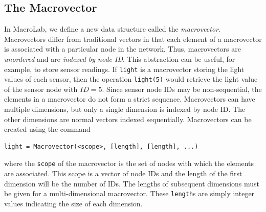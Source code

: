 \subsection{The Macrovector}

In MacroLab, we define a new data structure called the {\em macrovector}.
Macrovectors differ from traditional vectors in that each element of a
macrovector is associated with a particular node in the network.
Thus, macrovectors are \emph{unordered} and are \emph{indexed by node ID}.
This abstraction can be useful, for example, to store sensor readings. If
{\tt light} is a macrovector storing the light values of each sensor,
then the operation {\tt light(5)} would retrieve the light value of the sensor
node with $ID=5$. Since sensor node IDs may be non-sequential, the elements
in a macrovector do not form a strict sequence.
Macrovectors can have multiple dimensions, but only a single dimension is
indexed by node ID.  The other dimensions are normal vectors indexed sequentially.
Macrovectors can be created using the command
\vspace{.1in}
\begin{center}
\ttfamily\small
\begin{verbatim}
light = Macrovector(<scope>, [length], [length], ...)
\end{verbatim}
\end{center}
\vspace{.1in} 
\noindent where the {\tt scope} of the macrovector is the set of nodes
with which the elements are associated.  This scope is a vector of node
IDs and the length of the first dimension will be the number of IDs.  The
lengths of subsequent dimensions must be given for a multi-dimensional
macrovector. These {\tt length}s are simply integer values indicating the
size of each dimension.

